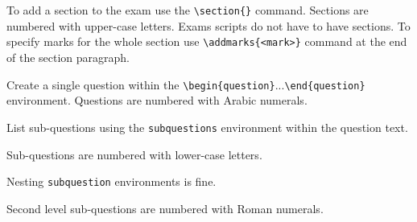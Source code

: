 \documentclass[answers]{otagoexam}
\begin{document}
\maketitle




\section{}

To add a section to the exam use the \verb$\section{}$ command.  Sections are numbered with upper-case letters.  Exams scripts do not have to have sections.  To specify marks for the whole section use \verb$\addmarks{<mark>}$ command at the end of the section paragraph.

\begin{question}

    Create a single question within the \texttt{\textbackslash begin\{question\}}...\texttt{\textbackslash end\{question\}} environment.  Questions are numbered with Arabic numerals.

    \begin{subquestions}
        \item List sub-questions using the \texttt{subquestions} environment within the question text.
        \item Sub-questions are numbered with lower-case letters.

        \item{
            \begin{subquestions}
                \item Nesting \texttt{subquestion} environments is fine.
                \item Second level sub-questions are numbered with Roman numerals.
            \end{subquestions}
        }
        
    \end{subquestions}


\end{question}
\end{document}
